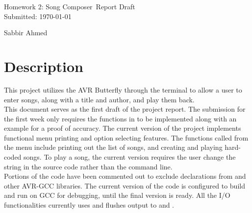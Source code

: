 \documentclass[usletter, 12pt]{article}
\newcommand{\project}{Homework 2: Song Composer}
\newcommand{\Sabbir}{Sabbir Ahmed}
\begin{document}

    \begin{titlepage}

        \vspace*{\fill} %
        \begin{center}

            {\LARGE \project~Report Draft}\\ [1.5cm]

            Submitted: \today
            
            \vspace*{\fill}

            \Sabbir

        \end{center}
        \vspace*{\fill} %

    \end{titlepage}

    \section{Description}

    This project utilizes the AVR Butterfly through the terminal to allow a user to enter songs, along with a title and author, and play them back. \\

    \noindent This document serves as the first draft of the project report. The submission for the first week only requires the functions in  to be implemented along with an example for a proof of accuracy. The current version of the project implements functional menu printing and option selecting features. The functions called from the menu include printing out the list of songs, and creating and playing hard-coded songs. To play a song, the current version requires the user change the string in the source code rather than the command line. \\

    \noindent Portions of the code have been commented out to exclude declarations from  and other AVR-GCC libraries. The current version of the code is configured to build and run on GCC for debugging, until the final version is ready. All the I/O functionalities currently uses  and flushes output to  and .
\end{document}
